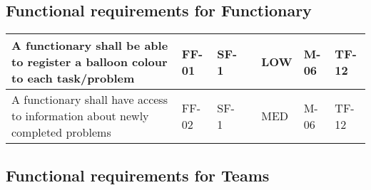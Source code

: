 \subsection{Functional requirements for Functionary}

\begin{longtable}{|m{1.1191599in}|m{0.33795986in}|m{0.33795986in}|m{1.2580599in}|m{0.5045598in}|m{1.1191599in}|m{1.0775598in}|}
\hline A functionary shall be able to register a balloon colour to each
task/problem & FF-01 & SF-1 &
 & LOW & M-06 & TF-12\\\hline A functionary shall have access to information
about newly completed problems & FF-02 & SF-1 &
 & MED & M-06 & TF-12\\\hline
\end{longtable}

\subsection{Functional requirements for Teams}

